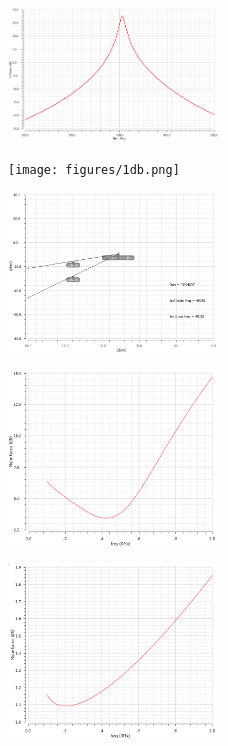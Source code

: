 \begin{figure}[h]
   \centering
    \includegraphics[width=0.5\textwidth]{figures/s21.png}
    \caption{}
    \label{fig:s21}
\end{figure}

\begin{figure}[h]
   \centering
    \texttt{[image: figures/1db.png]}
    \caption{}
    \label{fig:1db}
\end{figure}

\begin{figure}[h]
   \centering
    \includegraphics[width=0.5\textwidth]{figures/lnaiip3.png}
    \caption{}
    \label{fig:lnaiip3}
\end{figure}

\begin{figure}[h]
   \centering
    \includegraphics[width=0.5\textwidth]{figures/lnanoise.png}
    \caption{ }
    \label{fig:lnanoise}
\end{figure}

\begin{figure}[h]
   \centering
    \includegraphics[width=0.5\textwidth]{figures/lnanoisemin.png}
    \caption{}
    \label{fig:lnanoisemin}
\end{figure}

